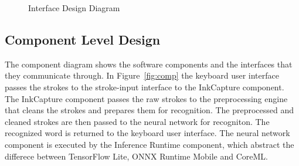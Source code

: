\documentclass[12pt,a4paper]{report}
\begin{document}
\begin{figure}[!ht]
\centering
{}
\caption{Interface Design Diagram}\label{fig:ui}
\end{figure}

\subsection{Component Level Design}
The component diagram shows the software components and the interfaces that they communicate through. In Figure~\ref{fig:comp} the keyboard user interface passes the strokes to the stroke-input interface to the InkCapture component. The InkCapture component passes the raw strokes to the preprocessing engine that cleans the strokes and prepares them for recognition. The preprocessed and cleaned strokes are then passed to the neural network for recogniton. The recognized word is returned to the keyboard user interface. The neural network component is executed by the Inference Runtime component, which abstract the differece between TensorFlow Lite, ONNX Runtime Mobile and CoreML.
\end{document}
